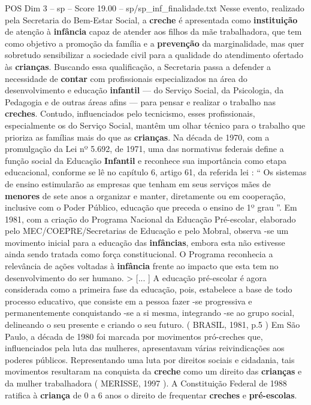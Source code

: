 \begin{textsample}{POS Dim 3 – sp – Score 19.00 – sp/sp\_inf\_finalidade.txt}
Nesse evento, realizado pela Secretaria do Bem-Estar Social, a \textbf{creche} é apresentada como \textbf{instituição} de atenção à \textbf{infância} capaz de atender aos filhos da mãe trabalhadora, que tem como objetivo a promoção da família e a \textbf{prevenção} da marginalidade, mas quer sobretudo sensibilizar a sociedade civil para a qualidade do atendimento ofertado às \textbf{crianças}.
Buscando essa qualificação, a Secretaria passa a defender a necessidade de \textbf{contar} com profissionais especializados na área do desenvolvimento e educação \textbf{infantil} — do Serviço Social, da Psicologia, da Pedagogia e de outras áreas afins — para pensar e realizar o trabalho nas \textbf{creches}.
Contudo, influenciados pelo tecnicismo, esses profissionais, especialmente os do Serviço Social, mantêm um olhar técnico para o trabalho que prioriza as famílias mais do que as \textbf{crianças}.
Na década de 1970, com a promulgação da Lei nº 5.692, de 1971, uma das normativas federais define a função social da Educação \textbf{Infantil} e reconhece sua importância como etapa educacional, conforme se lê no capítulo 6, artigo 61, da referida lei : “ Os sistemas de ensino estimularão as empresas que tenham em seus serviços mães de \textbf{menores} de sete anos a organizar e manter, diretamente ou em cooperação, inclusive com o Poder Público, educação que preceda o ensino de 1º grau ”.
Em 1981, com a criação do Programa Nacional da Educação Pré-escolar, elaborado pelo MEC/COEPRE/Secretarias de Educação e pelo Mobral, observa -se um movimento inicial para a educação das \textbf{infâncias}, embora esta não estivesse ainda sendo tratada como força constitucional.
O Programa reconhecia a relevância de ações voltadas à \textbf{infância} frente ao impacto que esta tem no desenvolvimento do ser humano. > [... ] A educação pré-escolar é agora considerada como a primeira fase da educação, pois, estabelece a base de todo processo educativo, que consiste em a pessoa fazer -se progressiva e permanentemente conquistando -se a si mesma, integrando -se ao grupo social, delineando o seu presente e criando o seu futuro. ( BRASIL, 1981, p.5 ) Em São Paulo, a década de 1980 foi marcada por movimentos pró-creches que, influenciados pela luta das mulheres, apresentavam várias reivindicações aos poderes públicos.
Representando uma luta por direitos sociais e cidadania, tais movimentos resultaram na conquista da \textbf{creche} como um direito das \textbf{crianças} e da mulher trabalhadora ( MERISSE, 1997 ).
A Constituição Federal de 1988 ratifica à \textbf{criança} de 0 a 6 anos o direito de frequentar \textbf{creches} e \textbf{pré-escolas}.

\end{textsample}
